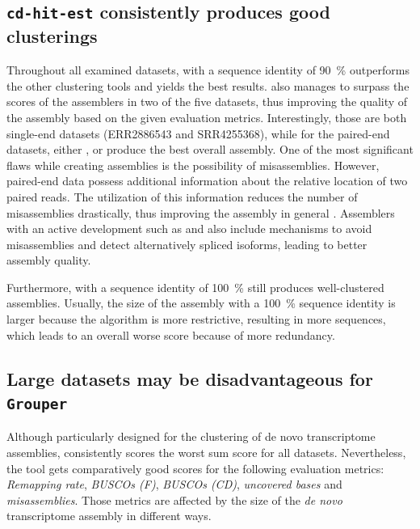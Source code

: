 \documentclass[12pt,a4paper,english]{article}
\begin{document}
	\subsection{\texttt{cd-hit-est} consistently produces good clusterings}
		\label{ssec:cdhit_is_best}
        Throughout all examined datasets, \cdhit with a sequence identity of 90~\% outperforms the other clustering tools and yields the best results. \cdhit also manages to surpass the scores of the assemblers in two of the five datasets, thus improving the quality of the assembly based on the given evaluation metrics. Interestingly, those are both single-end datasets (ERR2886543 and SRR4255368), while for the paired-end datasets, either \spades, \soap or \trinity produce the best overall assembly.
		One of the most significant flaws while creating assemblies is the possibility of misassemblies. However, paired-end data possess additional information about the relative location of two paired reads.
		The utilization of this information reduces the number of misassemblies drastically, thus improving the assembly in general \citep{misassembly:15}.    
		Assemblers with an active development such as \spades \citep{rnaSPAdes:18} and \trinity \citep{Trinity:11} also include mechanisms to avoid misassemblies and detect alternatively spliced isoforms, leading to better assembly quality.
		
		Furthermore, \cdhit with a sequence identity of 100~\% still produces well-clustered assemblies. Usually, the size of the assembly with a 100~\% sequence identity is larger because the algorithm is more restrictive, resulting in more sequences, which leads to an overall worse score because of more redundancy.
	
	\subsection{Large datasets may be disadvantageous for \texttt{Grouper}}
		\label{ssec:discussion:grouper}
		Although particularly designed for the clustering of de novo transcriptome assemblies, \grouper consistently scores the worst sum score for all datasets.
		Nevertheless, the tool gets comparatively good scores for the following evaluation metrics: \textit{Remapping rate}, \textit{BUSCOs (F)}, \textit{BUSCOs (CD)}, \textit{uncovered bases} and \textit{misassemblies}.
		Those metrics are affected by the size of the \textit{de novo} transcriptome assembly in different ways.
		
\end{document}
